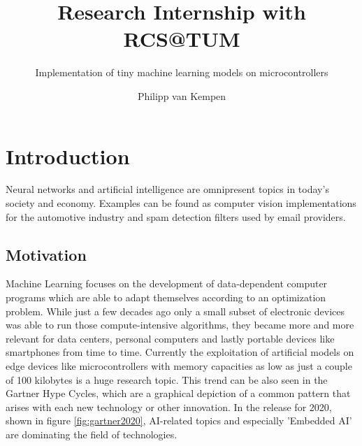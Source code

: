 \documentclass[oneside]{tum-book}
\title{Research Internship with RCS@TUM}
\subtitle{Implementation of tiny machine learning models on microcontrollers}
\author{Philipp van Kempen}
\begin{document}


\frontmatter






\mainmatter

\chapter{Introduction}
\vspace{-1em}
Neural networks and artificial intelligence are omnipresent topics in today's society and economy. Examples can be found as computer vision implementations for the automotive industry and spam detection filters used by email providers.
\vspace{-1em}
\section{Motivation}

Machine Learning focuses on the development of data-dependent computer programs which are able to adapt themselves according to an optimization problem. While just a few decades ago only a small subset of electronic devices was able to run those compute-intensive algorithms, they became more and more relevant for data centers, personal computers and lastly portable devices like smartphones from time to time. Currently the exploitation of artificial models on edge devices like microcontrollers with memory capacities as low as just a couple of 100 kilobytes is a huge research topic. This trend can be also seen in the Gartner Hype Cycles, which are a graphical depiction of a common pattern that arises with each new technology or other innovation. In the release for 2020, shown in figure \ref{fig:gartner2020}, AI-related topics and especially 'Embedded AI' are dominating the field of technologies.
\end{document}

